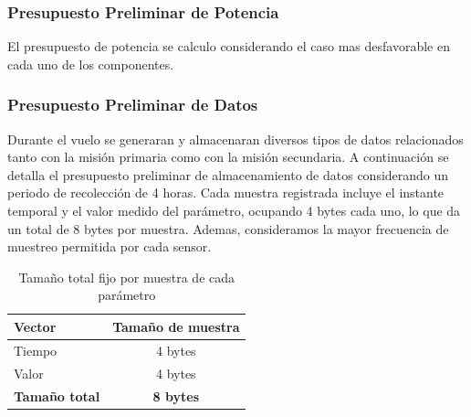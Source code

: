     \subsubsection{Presupuesto Preliminar de Potencia}
      El presupuesto de potencia se calculo considerando el caso mas desfavorable en cada uno
      de los componentes.

      \begin{table}[H]
      \centering
      \caption{Consumo de corriente y potencia de los componentes en el caso más desfavorable.}
      \label{tab:consumo_componentes}
      \end{table}

    \subsubsection{Presupuesto Preliminar de Datos}
      Durante el vuelo se generaran y almacenaran diversos tipos de datos relacionados tanto
      con la misión primaria como con la misión secundaria. A continuación se detalla el presupuesto preliminar de almacenamiento de datos considerando un periodo de recolección de 4
      horas.
      Cada muestra registrada incluye el instante temporal y el valor medido del parámetro, ocupando 4 bytes cada uno, lo que da un total de 8 bytes por muestra. Ademas, consideramos
      la mayor frecuencia de muestreo permitida por cada sensor.

      \begin{table}[H]
      \centering
      \begin{tabular}{|l|c|}
      \hline
      \textbf{Vector} & \textbf{Tamaño de muestra} \\
      \hline
      Tiempo & 4 bytes \\
      Valor  & 4 bytes \\
      \hline
      \textbf{Tamaño total} & \textbf{8 bytes} \\
      \hline
      \end{tabular}
      \caption{Tamaño total fijo por muestra de cada parámetro}
      \label{tab:tamanio_muestra}
      \end{table}

